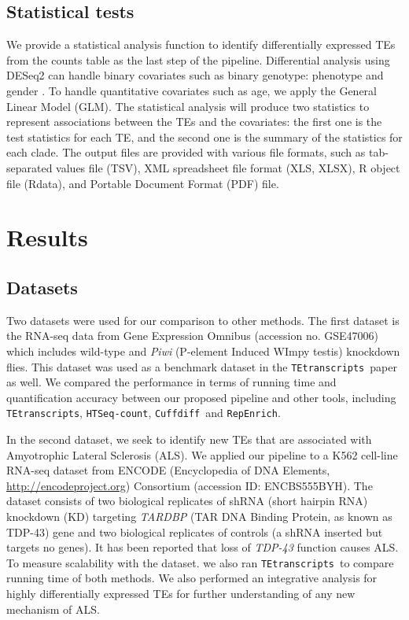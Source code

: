 \documentclass[wsdraft]{ws-procs11x85}
\newcommand{\TEtranscripts}{\texttt{TEtranscripts}}
\newcommand{\HTSeq}{\texttt{HTSeq-count}}
\newcommand{\Cuffdiff}{\texttt{Cuffdiff}}
\newcommand{\RepEnrich}{\texttt{RepEnrich}}
\begin{document}
\subsection{Statistical tests}
We provide a statistical analysis function to identify differentially expressed TEs from the counts table as the last step of the pipeline. 
Differential analysis using DESeq2 can handle  binary covariates such as binary genotype: phenotype and gender \cite{love2014moderated}. To handle quantitative covariates such as age, we apply the General Linear Model (GLM)\cite{johnston1980multivariate}. The statistical analysis will produce two statistics to represent associations between the TEs and the covariates: the first one is the test statistics for each TE, and the second one is the summary of the statistics for each clade. 
The output files are provided with various file formats, such as tab-separated values file (TSV), XML spreadsheet file format (XLS, XLSX), R object file (Rdata), and Portable Document Format (PDF) file.

\section{Results}

\subsection{Datasets}
Two datasets were used for our comparison to other methods. 
The first dataset is the RNA-seq data from Gene Expression Omnibus (accession no. GSE47006)
which includes wild-type and \textit{Piwi} (P-element Induced WImpy testis) knockdown flies. This dataset was used as a benchmark dataset in the \TEtranscripts~paper as well.\cite{ohtani2013dmgtsf1} We compared the performance in terms of running time and quantification accuracy between our proposed pipeline and other tools, including \TEtranscripts, \HTSeq, \Cuffdiff~and \RepEnrich.\cite{jin2015tetranscripts,anders2015htseq,trapnell2013differential,criscione2014repenrich}

In the second dataset, we seek to identify new TEs that are associated with Amyotrophic Lateral Sclerosis (ALS). 
We  applied our pipeline to a K562 cell-line RNA-seq dataset from ENCODE (Encyclopedia of DNA Elements, \url{http://encodeproject.org})  Consortium (accession ID: ENCBS555BYH).\cite{encode2012integrated}
The dataset consists of two biological replicates of shRNA (short hairpin RNA) knockdown (KD) targeting \textit{TARDBP} (TAR DNA Binding Protein, as known as TDP-43) gene and two biological replicates of controls (a shRNA inserted but targets no genes). 
It has been reported that loss of \textit{TDP-43} function causes  ALS.\cite{yang2014partial,mihevc2016tdp} To measure scalability with the dataset. we also ran \TEtranscripts~to compare running time of both methods. We also performed an integrative analysis for highly differentially expressed TEs for further understanding of any new mechanism of ALS.
\end{document}
